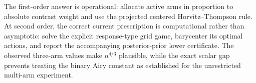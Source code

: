 The first-order answer is operational: allocate active arms in proportion to absolute contrast weight and use the projected centered Horvitz--Thompson rule.  At second order, the correct current prescription is computational rather than asymptotic: solve the explicit response-type grid game, barycenter its optimal actions, and report the accompanying posterior-prior lower certificate.  The observed three-arm values make \(n^{4/3}\) plausible, while the exact scalar gap prevents treating the binary Airy constant as established for the unrestricted multi-arm experiment.